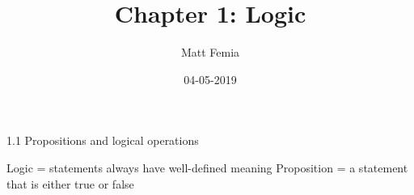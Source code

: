 \documentclass{article}
\title{Chapter 1: Logic}
\date{04-05-2019}
\author{Matt Femia}
\begin{document}
1.1 Propositions and logical operations

Logic = statements always have well-defined meaning
Proposition = a statement that is either true or false
\end{document}
